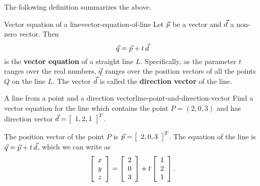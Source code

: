 \documentclass{ximera}
\begin{document}
\begin{center}
\end{center}
The following definition summarizes the above.

\begin{definition}{Vector equation of a line}{vector-equation-of-line}
  Let $\vect{p}$ be a vector and $\vect{d}$ a non-zero vector. Then
  \begin{equation*}
    \vect{q} = \vect{p} + t\,\vect{d}
  \end{equation*}
  is the \textbf{vector equation}%
   of a straight line $L$. Specifically,
  as the parameter $t$ ranges over the real numbers, $\vect{q}$ ranges
  over the position vectors of all the points $Q$ on the line $L$.
  The vector $\vect{d}$ is called the \textbf{direction vector}%
   of the line.
\end{definition}

\begin{example}{A line from a point and a direction vector}{line-point-and-direction-vector}
  Find a vector equation for the line which contains the point
  $P = (2,0,3)$ and has direction vector
  $\vect{d} = \startmat{c}1,2,1\stopmat^T$.
\end{example}

\begin{solution}
  The position vector of the point $P$ is
  $\vect{p}=\startmat{c}2,0,3\stopmat^T$. The equation of the line is
  $\vect{q}= \vect{p} + t\,\vect{d}$, which we can write as
  \begin{equation*}
    \startmat{c} x \\ y \\ z \stopmat
    = \startmat{c} 2 \\ 0 \\ 3 \stopmat
    + t \startmat{c} 1 \\ 2 \\ 1 \stopmat.
  \end{equation*}
\end{solution}
\end{document}
